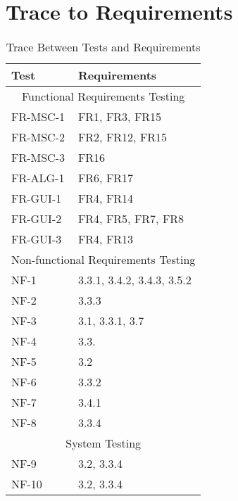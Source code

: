 \documentclass[12pt, titlepage]{article}
\begin{document}
\section{Trace to Requirements}

\begin{table}[!htbp]
\begin{tabular}{ll}
\toprule
Test & Requirements \\
\midrule
\multicolumn{2}{c}{Functional Requirements Testing} \\
\midrule
FR-MSC-1 & FR1, FR3, FR15\\
FR-MSC-2 & FR2, FR12, FR15 \\
FR-MSC-3 & FR16 \\
FR-ALG-1 & FR6, FR17\\
FR-GUI-1 & FR4, FR14\\
FR-GUI-2 & FR4, FR5, FR7, FR8\\
FR-GUI-3 & FR4, FR13\\
\midrule
\multicolumn{2}{c}{Non-functional Requirements Testing} \\
\midrule
NF-1 & 3.3.1, 3.4.2, 3.4.3, 3.5.2 \\
NF-2 & 3.3.3\\
NF-3 & 3.1, 3.3.1, 3.7\\
NF-4 & 3.3.\\
NF-5 & 3.2\\
NF-6 & 3.3.2 \\
NF-7 & 3.4.1 \\
NF-8 & 3.3.4\\
\midrule
\multicolumn{2}{c}{System Testing} \\
\midrule
NF-9 & 3.2, 3.3.4\\
NF-10 & 3.2, 3.3.4\\

\bottomrule
\end{tabular}

\caption{Trace Between Tests and Requirements}
\makeatletter
\def\rulecolor#1#{\CT@arc{#1}}
\def\CT@arc#1#2{%
\ifdim\baselineskip=\z@\noalign\fi
{\gdef\CT@arc@{\color#1{#2}}}}
\let\CT@arc@\relax
{}
\makeatother
\label{Table}
\end{table}
\FloatBarrier
\newpage
\end{document}
